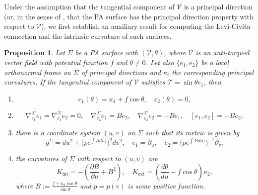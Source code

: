 \documentclass[12pt,reqno]{amsart}
\def\v{\mathcal V}
\def\t{\mathcal T}
\newtheorem{proposition}[theorem]{Proposition}
\theoremstyle{definition}
\begin{document}
Under the assumption that the tangential component of $\v$ is a principal direction (or, in the sense of \cite{mtv}, that the PA surface has the principal direction property with respect to $\v$), we first establish an auxiliary result for computing the Levi-Civita connection and the intrinsic curvature of such surfaces.

\begin{proposition}\label{plevi}
Let $\Sigma$ be a PA surface with $(\v,\theta)$, where $\v$ is an anti-torqued vector field with potential function $f$ and $\theta\neq0$. Let also $\{e_1,e_2\}$ be a local orthonormal frame on $\Sigma$ of principal directions and $\kappa_i$ the corresponding principal curvatures. 
If the tangential component of $\v$ satisfies $\t=\sin \theta e_1$, then 
\begin{enumerate}
\item[(i)]
\begin{equation}\label{e12}
e_1(\theta)=\kappa_1+f\cos\theta, \quad e_2(\theta)=0,
\end{equation}
\item[(ii)] 
\begin{equation}\label{levi}
\nabla^\Sigma_{e_1}e_1=\nabla^\Sigma_{e_1}e_2=0, \quad \nabla^\Sigma_{e_2}e_1=Be_2, \quad \nabla^\Sigma_{e_2}e_2=-Be_1, \quad [e_1,e_2]=-Be_2,
\end{equation}
\item[(iii)] there is a coordinate system $(u,v)$ on $\Sigma$ such that its metric is given by
\begin{equation}\label{intcur0}
g^\Sigma=du^2+\big(pe^{\int Bdu)}\big)^2dv^2, \quad e_1=\partial_u, \quad e_2=\big(pe^{\int Bdu)}\big)^{-1}\partial_v,
\end{equation}
\item[(iv)] the curvatures of $\Sigma$ with respect to $(u,v)$ are
\begin{equation}\label{intcur}
K_{\mathrm{int}}=-\left(\frac{\partial B}{\partial u}+B^2\right), \quad K_{\mathrm{ext}}=\left(\frac{d\theta}{du}-f\cos\theta\right)\kappa_2,
\end{equation}
where $B:=\frac{f+\kappa_2\cos\theta}{\sin \theta}$ and $p=p(v)$ is some positive function. 
\end{enumerate}
\end{proposition}
\end{document}
